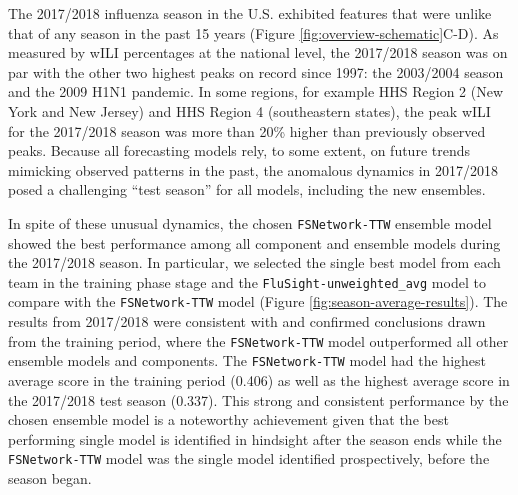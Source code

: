 \documentclass{article}\usepackage[]{graphicx}\usepackage[]{color}
\begin{document}
The 2017/2018 influenza season in the U.S. exhibited features that were unlike that of any season in the past 15 years (Figure \ref{fig:overview-schematic}C-D).
As measured by wILI percentages at the national level, the 2017/2018 season was on par with the other two highest peaks on record since 1997: the 2003/2004 season and the 2009 H1N1 pandemic.
In some regions, for example HHS Region 2 (New York and New Jersey) and HHS Region 4 (southeastern states), the peak wILI for the 2017/2018 season was more than 20\% higher than previously observed peaks.
Because all forecasting models rely, to some extent, on future trends mimicking observed patterns in the past, the anomalous dynamics in 2017/2018 posed a challenging ``test season'' for all models, including the new ensembles.

In spite of these unusual dynamics, the chosen {\tt FSNetwork-TTW} ensemble model showed the best performance among all component and ensemble models during the 2017/2018 season.
In particular, we selected the single best model from each team in the training phase stage and the {\tt FluSight-unweighted\_avg} model to compare with the {\tt FSNetwork-TTW} model (Figure \ref{fig:season-average-results}).
The results from 2017/2018 were consistent with and confirmed conclusions drawn from the training period, where the {\tt FSNetwork-TTW} model outperformed all other ensemble models and components.
The {\tt FSNetwork-TTW} model had the highest average score in the training period 
(0.406) 
as well as the highest average score in the 2017/2018 test season 
(0.337).
This strong and consistent performance by the chosen ensemble model is a noteworthy achievement given that the best performing single model is identified in hindsight after the season ends while the {\tt FSNetwork-TTW} model was the single model identified prospectively, before the season began. 
\end{document}
